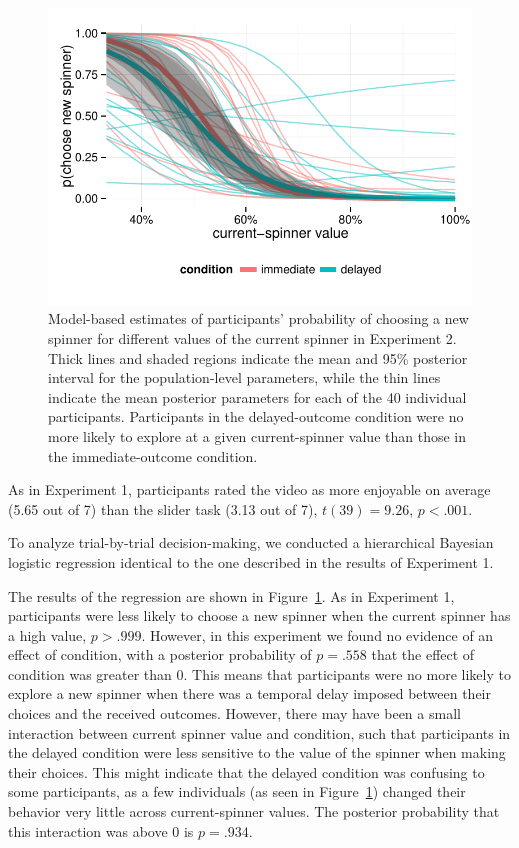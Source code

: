\documentclass[10pt,letterpaper]{article}
\begin{document}
\begin{figure}
\centering
\includegraphics[width=\columnwidth]{figures/exp2results.pdf}
\caption{Model-based estimates of participants' probability of choosing a new
  spinner for different values of the current spinner in Experiment 2. Thick
  lines and shaded regions indicate the mean and 95\% posterior interval for the
  population-level parameters, while the thin lines indicate the mean posterior
  parameters for each of the 40 individual participants. Participants in the
  delayed-outcome condition were no more
  likely to explore at a given current-spinner value than those in the
  immediate-outcome condition.}
\label{fig:exp2results}
\end{figure}

As in Experiment 1, participants rated the video as more enjoyable on average (5.65 out of 7) than the
slider task (3.13 out of 7), $t(39)=9.26$, $p<.001$.

To analyze trial-by-trial decision-making, we conducted a hierarchical Bayesian
logistic regression identical to the one described in the results of Experiment 1.

The results of the regression are shown in Figure~\ref{fig:exp2results}. As in Experiment 1,
participants were less likely to choose a new spinner when the current spinner
has a high value, $p>.999$. However, in this experiment we found no evidence of
an effect of condition, with a posterior probability of $p=.558$ that the effect of condition was
greater than 0. This means that participants were no more likely to explore a new spinner when there
was a temporal delay imposed between their choices and the received outcomes.
However, there may have been a small interaction between current spinner value and
condition, such that participants in the delayed condition were less sensitive
to the value of the spinner when making their choices. This might indicate that
the delayed condition was confusing to some participants, as a few individuals
(as seen in Figure~\ref{fig:exp2results}) changed their behavior very little
across current-spinner values. The posterior probability that this interaction
was above 0 is $p=.934$.
\end{document}
